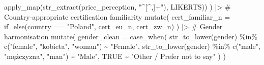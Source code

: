 \documentclass[
  letterpaper,
  DIV=11,
  numbers=noendperiod]{scrartcl}
\newenvironment{Shaded}{\begin{snugshade}}{\end{snugshade}}
\newcommand{\AttributeTok}[1]{\textcolor[rgb]{0.40,0.45,0.13}{#1}}
\newcommand{\CommentTok}[1]{\textcolor[rgb]{0.37,0.37,0.37}{#1}}
\newcommand{\ConstantTok}[1]{\textcolor[rgb]{0.56,0.35,0.01}{#1}}
\newcommand{\FunctionTok}[1]{\textcolor[rgb]{0.28,0.35,0.67}{#1}}
\newcommand{\NormalTok}[1]{\textcolor[rgb]{0.00,0.23,0.31}{#1}}
\newcommand{\SpecialCharTok}[1]{\textcolor[rgb]{0.37,0.37,0.37}{#1}}
\newcommand{\StringTok}[1]{\textcolor[rgb]{0.13,0.47,0.30}{#1}}
\begin{document}
\begin{Shaded}
\begin{Highlighting}[]
      \FunctionTok{apply\_map}\NormalTok{(}\FunctionTok{str\_extract}\NormalTok{(price\_perception, }\StringTok{"\^{}[\^{},]+"}\NormalTok{), LIKERTS))}
\NormalTok{  ) }\SpecialCharTok{|\textgreater{}}
  \CommentTok{\# Country{-}appropriate certification familiarity}
  \FunctionTok{mutate}\NormalTok{(}
    \AttributeTok{cert\_familiar\_n =} \FunctionTok{if\_else}\NormalTok{(country }\SpecialCharTok{==} \StringTok{"Poland"}\NormalTok{, cert\_eu\_n, cert\_zw\_n)}
\NormalTok{  ) }\SpecialCharTok{|\textgreater{}}
  \CommentTok{\# Gender harmonisation}
  \FunctionTok{mutate}\NormalTok{(}
    \AttributeTok{gender\_clean =} \FunctionTok{case\_when}\NormalTok{(}
      \FunctionTok{str\_to\_lower}\NormalTok{(gender) }\SpecialCharTok{\%in\%} \FunctionTok{c}\NormalTok{(}\StringTok{"female"}\NormalTok{, }\StringTok{"kobieta"}\NormalTok{, }\StringTok{"woman"}\NormalTok{) }\SpecialCharTok{\textasciitilde{}} \StringTok{"Female"}\NormalTok{,}
      \FunctionTok{str\_to\_lower}\NormalTok{(gender) }\SpecialCharTok{\%in\%} \FunctionTok{c}\NormalTok{(}\StringTok{"male"}\NormalTok{,   }\StringTok{"mężczyzna"}\NormalTok{, }\StringTok{"man"}\NormalTok{) }\SpecialCharTok{\textasciitilde{}} \StringTok{"Male"}\NormalTok{,}
      \ConstantTok{TRUE} \SpecialCharTok{\textasciitilde{}} \StringTok{"Other / Prefer not to say"}
\NormalTok{    )}
\NormalTok{  )}
\end{Highlighting}
\end{Shaded}
\end{document}
